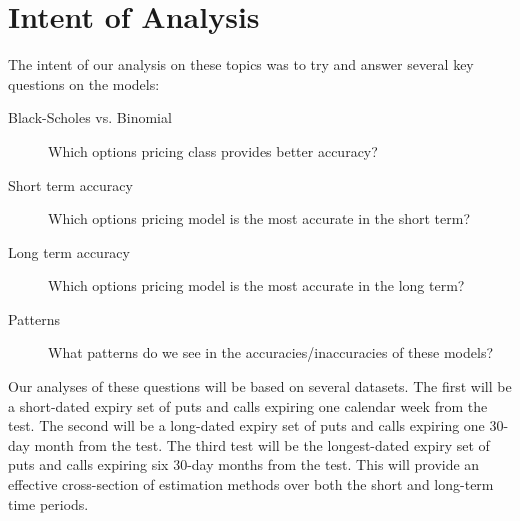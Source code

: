 \section{Intent of Analysis}

The intent of our analysis on these topics was to try and answer several key questions on the models:

\begin{description}
\item[Black-Scholes vs. Binomial] Which options pricing class provides better accuracy?
\item[Short term accuracy] Which options pricing model is the most accurate in the short term?
\item[Long term accuracy] Which options pricing model is the most accurate in the long term?
\item[Patterns] What patterns do we see in the accuracies/inaccuracies of these models?
\end{description}

Our analyses of these questions will be based on several datasets. The first will be a short-dated expiry set of puts and calls expiring one calendar week from the test. The second will be a long-dated expiry set of puts and calls expiring one 30-day month from the test. The third test will be the longest-dated expiry set of puts and calls expiring six 30-day months from the test. This will provide an effective cross-section of estimation methods over both the short and long-term time periods. 


